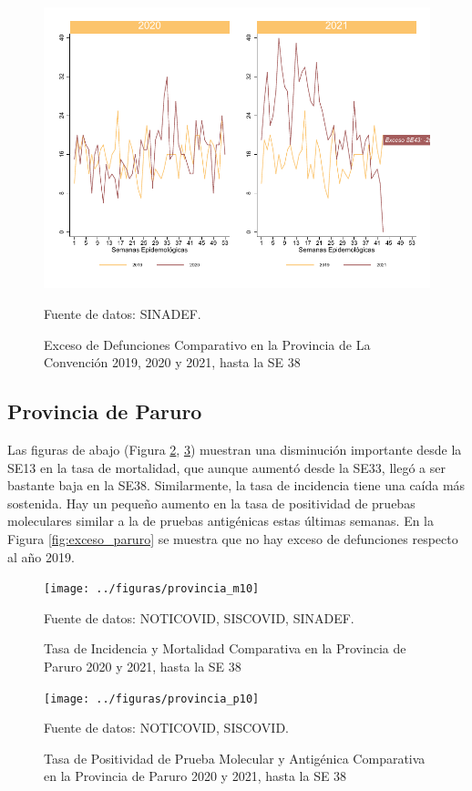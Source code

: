 \documentclass[12pt,a4paper,openany]{book}
\begin{document}
	\begin{figure}[h]
	\caption{Exceso de Defunciones Comparativo en la Provincia de La Convención 2019, 2020 y 2021, hasta la SE 38}\label{fig:exceso_laconv}
	\begin{center}
		\includegraphics[width=0.7\linewidth]{../figuras/exceso_9}
	\end{center}
	{\footnotesize {Fuente de datos: SINADEF.}}
	\end{figure}

\clearpage

	\subsection*{Provincia de Paruro}
	\noindent Las figuras de abajo (Figura \ref{fig:inc_mort_paruro}, \ref{fig:positividad_paruro})  muestran una disminución importante desde la SE13 en la tasa de mortalidad, que aunque aumentó desde la SE33, llegó a ser bastante baja en la SE38. Similarmente, la tasa de incidencia tiene una caída más sostenida. Hay un pequeño aumento en la tasa de positividad de pruebas moleculares similar a la de pruebas antigénicas estas últimas semanas. En la Figura \ref{fig:exceso_paruro} se muestra que no hay exceso de defunciones respecto al año 2019.

	\begin{figure}[h]
	\caption{Tasa de Incidencia y Mortalidad Comparativa en la Provincia de Paruro 2020 y 2021, hasta la SE 38}\label{fig:inc_mort_paruro}
	\begin{center}
		\texttt{[image: ../figuras/provincia\_m10]}
	\end{center}
	{\footnotesize {Fuente de datos: NOTICOVID, SISCOVID, SINADEF.}}
	\end{figure}

	\begin{figure}[h]
	\caption{Tasa de Positividad de Prueba Molecular y Antigénica Comparativa en la Provincia de Paruro 2020 y 2021, hasta la SE 38}\label{fig:positividad_paruro}
	\begin{center}
		\texttt{[image: ../figuras/provincia\_p10]}
	\end{center}
	{\footnotesize {Fuente de datos: NOTICOVID, SISCOVID.}}
	\end{figure}
\end{document}
